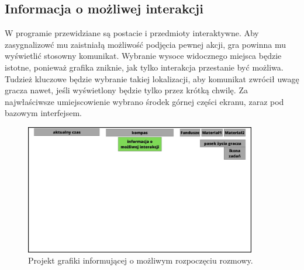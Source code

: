 \subsection{Informacja o możliwej interakcji}
W programie przewidziane są postacie i przedmioty interaktywne. Aby zasygnalizowć mu zaistniałą możliwość podjęcia pewnej akcji, 
gra powinna mu wyświetlić stosowny komunikat. Wybranie wysoce widocznego miejsca będzie istotne, ponieważ grafika zniknie,
jak tylko interakcja przestanie być możliwa. Tudzież kluczowe będzie wybranie takiej lokalizacji, aby komunikat zwrócił uwagę gracza nawet, 
jeśli wyświetlony będzie tylko przez krótką chwilę. Za najwłaściwsze umiejscowienie wybrano środek górnej części ekranu, zaraz
pod bazowym interfejsem.
    \begin{figure}[htbp]
    \centering
    \includegraphics[width=0.9\textwidth]{images/ui/ui_prooj_interakcja.jpg}
    \caption{Projekt grafiki informującej o możliwym rozpoczęciu rozmowy.}\label{fig:rozmow}
\end{figure}


